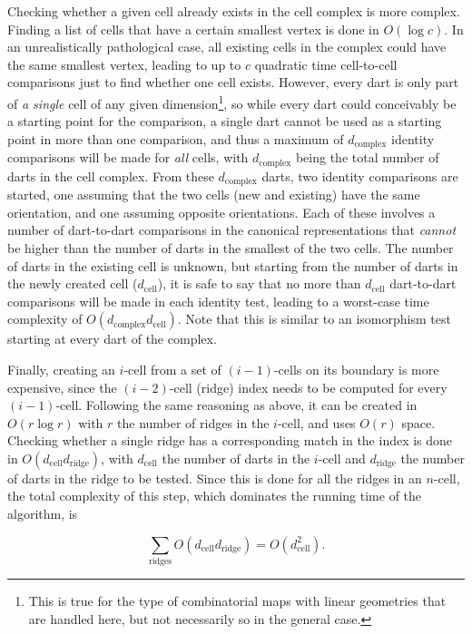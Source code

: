Checking whether a given cell already exists in the cell complex is more complex.
Finding a list of cells that have a certain smallest vertex is done in $O(\log c)$.
In an unrealistically pathological case, all existing cells in the complex could have the same smallest vertex, leading to up to $c$ quadratic time cell-to-cell comparisons just to find whether one cell exists.
However, every dart is only part of \emph{a single} cell of any given dimension\footnote{This is true for the type of combinatorial maps with linear geometries that are handled here, but not necessarily so in the general case.}, so while every dart could conceivably be a starting point for the comparison, a single dart cannot be used as a starting point in more than one comparison, and thus a maximum of $d_{\mathrm{complex}}$ identity comparisons will be made for \emph{all} cells, with $d_{\mathrm{complex}}$ being the total number of darts in the cell complex.
From these $d_{\mathrm{complex}}$ darts, two identity comparisons are started, one assuming that the two cells (new and existing) have the same orientation, and one assuming opposite orientations.
Each of these involves a number of dart-to-dart comparisons in the canonical representations that \emph{cannot} be higher than the number of darts in the smallest of the two cells.
The number of darts in the existing cell is unknown, but starting from the number of darts in the newly created cell ($d_{\mathrm{cell}}$), it is safe to say that no more than $d_{\mathrm{cell}}$ dart-to-dart comparisons will be made in each identity test, leading to a worst-case time complexity of $O(d_{\mathrm{complex}} d_{\mathrm{cell}})$.
Note that this is similar to an isomorphism test starting at every dart of the complex.

Finally, creating an $i$-cell from a set of $(i-1)$-cells on its boundary is more expensive, since the $(i-2)$-cell (ridge) index needs to be computed for every $(i-1)$-cell.
Following the same reasoning as above, it can be created in $O(r \log r)$ with $r$ the number of ridges in the $i$-cell, and uses $O(r)$ space.
Checking whether a single ridge has a corresponding match in the index is done in $O(d_{\mathrm{cell}} d_{\mathrm{ridge}})$, with $d_{\mathrm{cell}}$ the number of darts in the $i$-cell and $d_{\mathrm{ridge}}$ the number of darts in the ridge to be tested.
Since this is done for all the ridges in an $n$-cell, the total complexity of this step, which dominates the running time of the algorithm, is

\begin{equation*}
\displaystyle\sum_{\mathrm{ridges}} O(d_{\mathrm{cell}} d_{\mathrm{ridge}}) = O(d_{\mathrm{cell}}^{2}).
\end{equation*}

